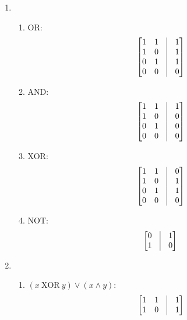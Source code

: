 \documentclass[hidelinks,12pt]{article}
\title{\scalebox{1.5}{CompSci 150 Homework 1}}
\author{\scalebox{1.5}{Theo Koss}}
\date{February 2024}
\begin{document}
\maketitle
\begin{enumerate}
    \item \begin{enumerate}
            \item OR:\[\begin{bmatrix}
                1 & 1 & \vline & 1\\
                1 & 0 & \vline & 1\\
                0 & 1 & \vline & 1\\
                0 & 0 & \vline & 0\\
            \end{bmatrix}\]
        \item AND: \[\begin{bmatrix}
                1 & 1 & \vline & 1\\
                1 & 0 & \vline & 0\\
                0 & 1 & \vline & 0\\
                0 & 0 & \vline & 0\\
            \end{bmatrix}\]
        \item XOR:\[\begin{bmatrix}
                1 & 1 & \vline & 0\\
                1 & 0 & \vline & 1\\
                0 & 1 & \vline & 1\\
                0 & 0 & \vline & 0\\
            \end{bmatrix}\]
        \item NOT:\[\begin{bmatrix}
                0 & \vline & 1\\
                1 & \vline & 0\\
            \end{bmatrix}\]
    \end{enumerate}
    \item\begin{enumerate}
            \item $(x\ \mathrm{XOR}\ y)\lor(x\land y)$:
                \[\begin{bmatrix}
                1 & 1 & \vline & 1\\
                1 & 0 & \vline & 1\\

\end{bmatrix}\]
\end{enumerate}
\end{enumerate}
\end{document}
